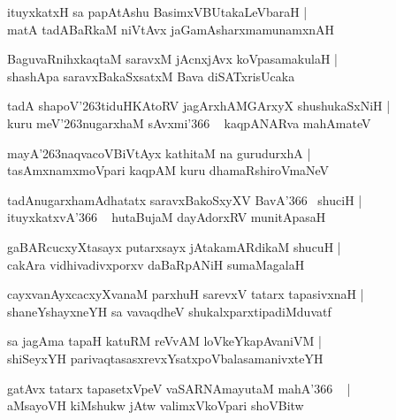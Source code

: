 \documentclass[twoside,12pt,openright]{book}
\def\S{\char'263}
\newcounter{shloka}[chapter]
\begin{document}
\begin{shloka}%
ituyxkatxH sa papAtAshu BasimxVBUtakaLeVbaraH |\\
matA tadABaRkaM niVtAvx jaGamAsharxmamunamxnAH 
\end{shloka}

\begin{shloka}%
BaguvaRnihxkaqtaM saravxM jAcnxjAvx koVpasamakulaH |\\
shashApa saravxBakaSxsatxM Bava diSATxrisUcaka
\end{shloka}

\begin{shloka}%
tadA shapoV\S tiduHKAtoRV jagArxhAMGArxyX shushukaSxNiH |\\
kuru meV\S nugarxhaM sAvxmi\char'366 ~ kaqpANARva mahAmateV 
\end{shloka}

\begin{shloka}%
mayA\S naqvacoVBiVtAyx kathitaM na gurudurxhA |\\
tasAmxnamxmoVpari kaqpAM kuru dhamaRshiroVmaNeV
\end{shloka}

\begin{shloka}%
tadAnugarxhamAdhatatx saravxBakoSxyXV BavA\char'366 ~shuciH |\\
ituyxkatxvA\char'366 ~ hutaBujaM dayAdorxRV munitApasaH
\end{shloka}

\begin{shloka}%
gaBARcucxyXtasayx putarxsayx jAtakamARdikaM shucuH |\\
cakAra vidhivadivxporxv daBaRpANiH sumaMagalaH 
\end{shloka}

\begin{shloka}%
cayxvanAyxcacxyXvanaM parxhuH sarevxV tatarx  tapasivxnaH |\\
shaneYshayxneYH sa vavaqdheV shukalxparxtipadiMduvatf 
\end{shloka}

\begin{shloka}%
sa jagAma tapaH katuRM reVvAM loVkeYkapAvaniVM |\\
shiSeyxYH parivaqtasasxrevxYsatxpoVbalasamanivxteYH
\end{shloka}

\begin{shloka}%
gatAvx tatarx tapasetxVpeV vaSARNAmayutaM mahA\char'366 ~ |\\
aMsayoVH kiMshukw jAtw valimxVkoVpari shoVBitw
\end{shloka}
\end{document}
